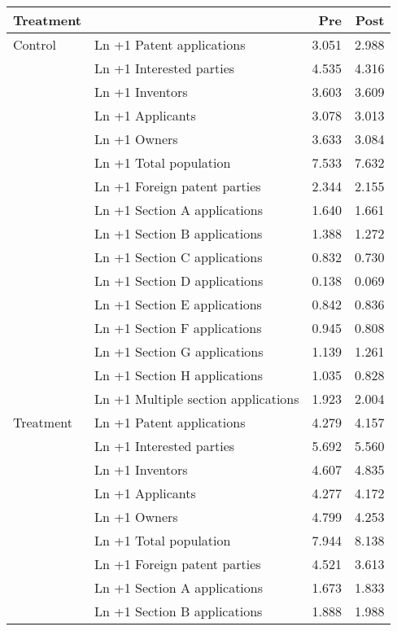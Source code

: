 
\begin{tabular}[t]{llrr}
\toprule
Treatment &   & Pre & Post\\
\midrule
Control & Ln +1 Patent applications & \num{3.051} & \num{2.988}\\
 & Ln +1 Interested parties & \num{4.535} & \num{4.316}\\
 & Ln +1 Inventors & \num{3.603} & \num{3.609}\\
 & Ln +1 Applicants & \num{3.078} & \num{3.013}\\
 & Ln +1 Owners & \num{3.633} & \num{3.084}\\
 & Ln +1 Total population & \num{7.533} & \num{7.632}\\
 & Ln +1 Foreign patent parties & \num{2.344} & \num{2.155}\\
 & Ln +1 Section A applications & \num{1.640} & \num{1.661}\\
 & Ln +1 Section B applications & \num{1.388} & \num{1.272}\\
 & Ln +1 Section C applications & \num{0.832} & \num{0.730}\\
 & Ln +1 Section D applications & \num{0.138} & \num{0.069}\\
 & Ln +1 Section E applications & \num{0.842} & \num{0.836}\\
 & Ln +1 Section F applications & \num{0.945} & \num{0.808}\\
 & Ln +1 Section G applications & \num{1.139} & \num{1.261}\\
 & Ln +1 Section H applications & \num{1.035} & \num{0.828}\\
 & Ln +1 Multiple section applications & \num{1.923} & \num{2.004}\\
Treatment & Ln +1 Patent applications & \num{4.279} & \num{4.157}\\
 & Ln +1 Interested parties & \num{5.692} & \num{5.560}\\
 & Ln +1 Inventors & \num{4.607} & \num{4.835}\\
 & Ln +1 Applicants & \num{4.277} & \num{4.172}\\
 & Ln +1 Owners & \num{4.799} & \num{4.253}\\
 & Ln +1 Total population & \num{7.944} & \num{8.138}\\
 & Ln +1 Foreign patent parties & \num{4.521} & \num{3.613}\\
 & Ln +1 Section A applications & \num{1.673} & \num{1.833}\\
 & Ln +1 Section B applications & \num{1.888} & \num{1.988}\\

\end{tabular}
